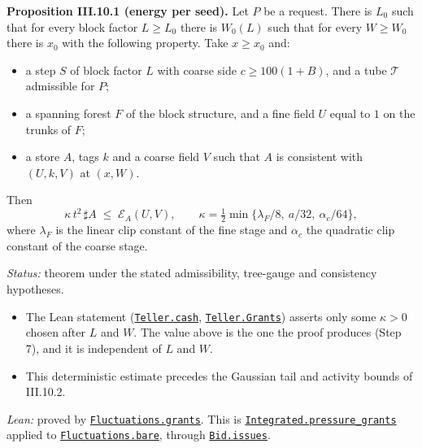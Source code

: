\documentclass[
  letterpaper,
  11pt]{article}
\providecommand{\tightlist}{%
  \setlength{\itemsep}{0pt}\setlength{\parskip}{0pt}}
\begin{document}
\textbf{Proposition III.10.1 (energy per seed).} Let \(P\) be a request.
There is \(L_0\) such that for every block factor \(L\ge L_0\) there is
\(W_0(L)\) such that for every \(W\ge W_0\) there is \(x_0\) with the
following property. Take \(x\ge x_0\) and:

\begin{itemize}
\tightlist
\item
  a step \(S\) of block factor \(L\) with coarse side \(c\ge100(1+B)\),
  and a tube \(\mathscr T\) admissible for \(P\);
\item
  a spanning forest \(F\) of the block structure, and a fine field \(U\)
  equal to \(1\) on the trunks of \(F\);
\item
  a store \(A\), tags \(k\) and a coarse field \(V\) such that \(A\) is
  consistent with \((U,k,V)\) at \((x,W)\).
\end{itemize}

Then
\[\kappa\,t^2\,\sharp A\;\le\;\mathcal E_A(U,V),\qquad \kappa=\tfrac12\min\{\lambda_F/8,\ a/32,\ \alpha_c/64\},\]
where \(\lambda_F\) is the linear clip constant of the fine stage and
\(\alpha_c\) the quadratic clip constant of the coarse stage.

\emph{Status:} theorem under the stated admissibility, tree-gauge and
consistency hypotheses.

\begin{itemize}
\tightlist
\item
  The Lean statement
  (\href{https://github.com/yang-mills-group/OpenAI-YM-20261028/blob/3456e5e75cf8d4cd558955a5c7638fba2d68f464/YM/Pressure/Seeds.lean\#L124-L125}{\texttt{Teller.cash}},
  \href{https://github.com/yang-mills-group/OpenAI-YM-20261028/blob/3456e5e75cf8d4cd558955a5c7638fba2d68f464/YM/Pressure/Seeds.lean\#L129-L131}{\texttt{Teller.Grants}})
  asserts only some \(\kappa>0\) chosen after \(L\) and \(W\). The value
  above is the one the proof produces (Step 7), and it is independent of
  \(L\) and \(W\).
\item
  This deterministic estimate precedes the Gaussian tail and activity
  bounds of III.10.2.
\end{itemize}

\emph{Lean:} proved by
\href{https://github.com/yang-mills-group/OpenAI-YM-20261028/blob/3456e5e75cf8d4cd558955a5c7638fba2d68f464/YM/Next/FLUCTUATIONS/Grants.lean\#L24}{\texttt{Fluctuations.grants}}.
This is
\href{https://github.com/yang-mills-group/OpenAI-YM-20261028/blob/3456e5e75cf8d4cd558955a5c7638fba2d68f464/YM/Integrated.lean\#L222-L225}{\texttt{Integrated.pressure\_grants}}
applied to
\href{https://github.com/yang-mills-group/OpenAI-YM-20261028/blob/3456e5e75cf8d4cd558955a5c7638fba2d68f464/YM/Next/FLUCTUATIONS/Bare.lean\#L64-L120}{\texttt{Fluctuations.bare}},
through
\href{https://github.com/yang-mills-group/OpenAI-YM-20261028/blob/3456e5e75cf8d4cd558955a5c7638fba2d68f464/YM/Bid/Energy.lean\#L155-L158}{\texttt{Bid.issues}}.
\end{document}
